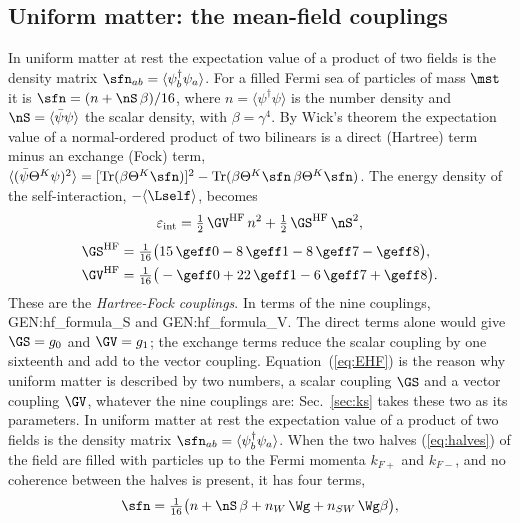 \subsection{Uniform matter: the mean-field couplings}
\label{sec:hf}

In uniform matter at rest the expectation value of a product of two fields is the density matrix
$\sfn_{ab}=\langle\psi_b^\dagger\psi_a\rangle$. For a filled Fermi sea of particles of mass $\mst$
it is $\sfn=(n+\nS\,\beta)/16$, where $n=\langle\psi^\dagger\psi\rangle$ is the number density and
$\nS=\langle\bar\psi\psi\rangle$ the scalar density, with $\beta=\gamma^{4}$. By Wick's theorem the
expectation value of a normal-ordered product of two bilinears is a direct (Hartree) term minus an
exchange (Fock) term,
$\langle(\bar\psi\Theta^{K}\psi)^{2}\rangle=[\mathrm{Tr}(\beta\Theta^{K}\sfn)]^{2}-\mathrm{Tr}(\beta\Theta^{K}\sfn\,\beta\Theta^{K}\sfn)$.
The energy density of the self-interaction, $-\langle\Lself\rangle$, becomes
\begin{equation}
\varepsilon_{\mathrm{int}}=\tfrac12\,\GV^{\mathrm{HF}}\,n^{2}+\tfrac12\,\GS^{\mathrm{HF}}\,\nS^{2},
\label{eq:EHF}
\end{equation}
\begin{equation}
\begin{aligned}
\GS^{\mathrm{HF}}&=\tfrac1{16}\big(15\,\geff0-8\,\geff1-8\,\geff7-\geff8\big),\\
\GV^{\mathrm{HF}}&=\tfrac1{16}\big(-\geff0+22\,\geff1-6\,\geff7+\geff8\big).
\end{aligned}
\label{eq:GHF}
\end{equation}
These are the \emph{Hartree-Fock couplings}. In terms of the nine couplings, {{GEN:hf_formula_S}}
and {{GEN:hf_formula_V}}. The direct terms alone would give $\GS=g_0$ and $\GV=g_1$; the exchange
terms reduce the scalar coupling by one sixteenth and add to the vector coupling.
Equation~(\ref{eq:EHF}) is the reason why uniform matter is described by two numbers, a scalar
coupling $\GS$ and a vector coupling $\GV$, whatever the nine couplings are: Sec.~\ref{sec:ks}
takes these two as its parameters.
In uniform matter at rest the expectation value of a product of two fields is the density matrix
$\sfn_{ab}=\langle\psi_b^\dagger\psi_a\rangle$. When the two halves (\ref{eq:halves}) of the field are
filled with particles up to the Fermi momenta $k_{F+}$ and $k_{F-}$, and no coherence between the
halves is present, it has four terms,
\begin{equation}
\sfn=\tfrac1{16}\big(n+\nS\,\beta+n_W\,\Wg+n_{SW}\,\Wg\beta\big),
\label{eq:nhalves}
\end{equation}
